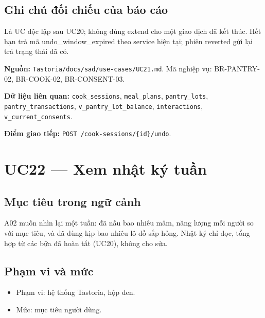 \subsection{Ghi chú đối chiếu của báo cáo}
Là UC độc lập sau UC20; không dùng extend cho một giao dịch đã kết thúc. Hết hạn trả mã undo\_\allowbreak{}window\_\allowbreak{}expired theo service hiện tại; phiên reverted gửi lại trả trạng thái đã có.

\textbf{Nguồn:} {\small\texttt{Tastoria/\allowbreak{}\allowbreak{}docs/\allowbreak{}\allowbreak{}sad/\allowbreak{}\allowbreak{}use-\allowbreak{}cases/\allowbreak{}\allowbreak{}UC21.\allowbreak{}md}}. Mã nghiệp vụ: BR-\allowbreak{}PANTRY-\allowbreak{}02, BR-\allowbreak{}COOK-\allowbreak{}02, BR-\allowbreak{}CONSENT-\allowbreak{}03.

\textbf{Dữ liệu liên quan:} {\small\texttt{cook\_\allowbreak{}\allowbreak{}sessions}}, {\small\texttt{meal\_\allowbreak{}\allowbreak{}plans}}, {\small\texttt{pantry\_\allowbreak{}\allowbreak{}lots}}, {\small\texttt{pantry\_\allowbreak{}\allowbreak{}transactions}}, {\small\texttt{v\_\allowbreak{}\allowbreak{}pantry\_\allowbreak{}\allowbreak{}lot\_\allowbreak{}\allowbreak{}balance}}, {\small\texttt{interactions}}, {\small\texttt{v\_\allowbreak{}\allowbreak{}current\_\allowbreak{}\allowbreak{}consents}}.

\textbf{Điểm giao tiếp:} {\small\texttt{POST /\allowbreak{}\allowbreak{}cook-\allowbreak{}sessions/\allowbreak{}\allowbreak{}\{id\}/\allowbreak{}\allowbreak{}undo}}.

\section{UC22 --- Xem nhật ký tuần}
\subsection{Mục tiêu trong ngữ cảnh}
A02 muốn nhìn lại một tuần: đã nấu bao nhiêu mâm, năng lượng mỗi người so với mục tiêu, và đã dùng kịp bao nhiêu lô đồ sắp hỏng. Nhật ký chỉ đọc, tổng hợp từ các bữa đã hoàn tất (UC20), không cho sửa.

\subsection{Phạm vi và mức}
\begin{itemize}
\item Phạm vi: hệ thống Tastoria, hộp đen.
\item Mức: mục tiêu người dùng.
\end{itemize}
